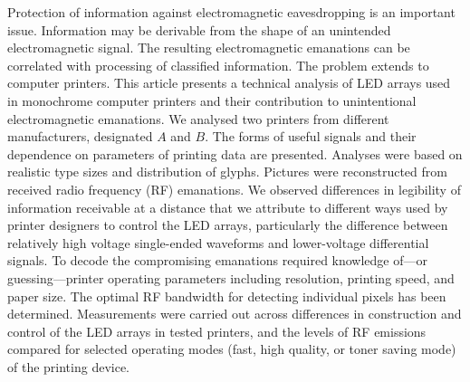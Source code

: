 Protection of information against electromagnetic eavesdropping is an
important issue. Information may be derivable from the shape of an unintended
electromagnetic signal. The resulting electromagnetic emanations can be
correlated with processing of classified information. The problem extends to
computer printers. This article presents a technical analysis of LED arrays
used in monochrome computer printers and their contribution to unintentional
electromagnetic emanations. We analysed two printers from different
manufacturers, designated $A$ and $B$. The forms of useful signals and their
dependence on parameters of printing data are presented. Analyses were based
on realistic type sizes and distribution of glyphs. Pictures were
reconstructed from received radio frequency (RF) emanations. We observed
differences in legibility of information receivable at a distance that we
attribute to different ways used by printer designers to control the LED arrays,
particularly the difference between relatively high voltage single-ended
waveforms and lower-voltage differential signals. To decode the compromising
emanations required knowledge of---or guessing---printer operating parameters
including resolution, printing speed, and paper size. The optimal RF bandwidth
for detecting individual pixels has been determined. Measurements were
carried out across differences in construction and control of the LED arrays
in tested printers, and the levels of RF emissions compared for selected
operating modes (fast, high quality, or toner saving mode) of the printing
device.
